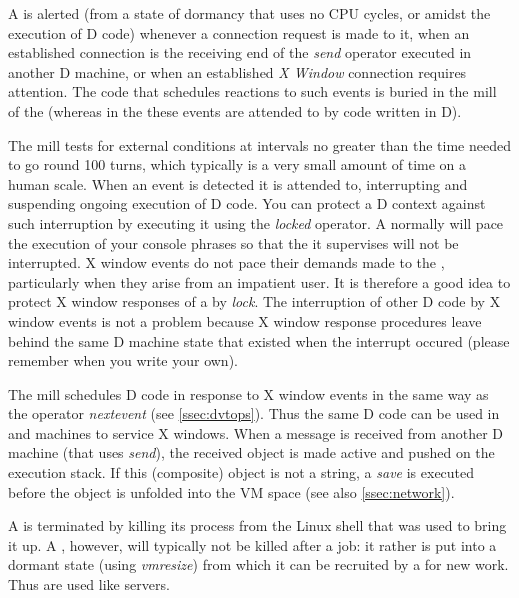  A  is alerted (from a state of dormancy that uses no CPU cycles, or amidst the execution of D code) whenever a connection request is made to it, when an established connection is the receiving end of the \emph{send} operator executed in another D machine, or when an established \emph{X Window} connection requires attention. The code that schedules reactions to such events is buried in the mill of the  (whereas in the  these events are attended to by code written in D).

The  mill tests for external conditions at intervals no greater than the time needed to go round 100 turns, which typically is a very small amount of time on a human scale. When an event is detected it is attended to, interrupting and suspending ongoing execution of D code.  You can protect a D context against such interruption by executing it using the \emph{locked} operator. A  normally will pace the execution of your console phrases so that the  it supervises will not be interrupted. X window events do not pace their demands made to the , particularly when they arise from an impatient user. It is therefore a good idea to protect X window responses of a  by \emph{lock}. The interruption of other D code by X window events is not a problem because X window response procedures leave behind the same D machine state that existed when the interrupt occured (please remember when you write your own).

The  mill schedules D code in response to X window events in the same way as the  operator \emph{nextevent} (see \ref{ssec:dvtops}). Thus the same D code can be used in  and  machines to service X windows. When a message is received from another D machine (that uses \emph{send}), the received object is made active and pushed on the execution stack. If this (composite) object is not a string, a \emph{save} is executed before the object is unfolded into the VM space (see also \ref{ssec:network}).

A  is terminated by killing its process from the Linux shell that was used to bring it up. A , however, will typically not be killed after a job: it rather is put into a dormant state (using \emph{vmresize}) from which it can be recruited by a  for new work. Thus  are used like servers.

